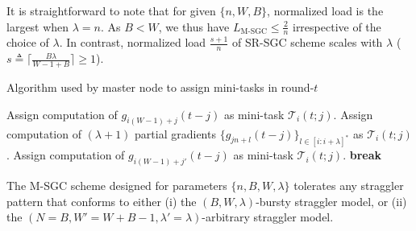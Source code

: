 \begin{remark}\normalfont\label{ch2:rem:comp_load_comparison}
    It is straightforward to note that for given $\{n,W,B\}$, normalized load is the largest when $\lambda=n$. As $B<W$, we thus have $L_\text{M-SGC}\leq \frac{2}{n}$ irrespective of the choice of $\lambda$. In contrast, normalized load $\frac{s+1}{n}$ of SR-SGC scheme scales with $\lambda$ ($s\triangleq \lceil\frac{B\lambda}{W-1+B}\rceil\geq 1$). 
\end{remark}



\begin{algorithm}
    \caption{Algorithm used by master node to assign mini-tasks in round-$t$}
    \label{ch2:alg:constr_b_sgc}
    \begin{algorithmic}	
        \State Assign computation of $g_{i(W-1)+j}(t-j)$ as mini-task $\mathcal{T}_i(t;j)$.
        \EndFor
        \State Assign computation of $(\lambda+1)$ partial gradients  $\{g_{jn+l}(t-j)\}_{l\in[i:i+\lambda]^*}$  as $\mathcal{T}_i(t;j)$.
        \Else
        \State Assign computation of $g_{i(W-1)+j'}(t-j)$ as mini-task $\mathcal{T}_i(t;j)$.
        \State \textbf{break} 
        \EndIf
        \EndFor	
        \EndIf
        \EndFor
        \EndFor
    \end{algorithmic}
\end{algorithm}


\begin{prop}\label{ch2:prop:scheme_m_sgc_straggler_tolerance}
    The M-SGC scheme designed for parameters  $\{n,B,W,\lambda\}$ tolerates any straggler pattern that conforms to either (i) the $(B,W,\lambda)$-bursty straggler model, or (ii) the $(N=B, W'=W+B-1, \lambda'=\lambda)$-arbitrary straggler model.
\end{prop}

